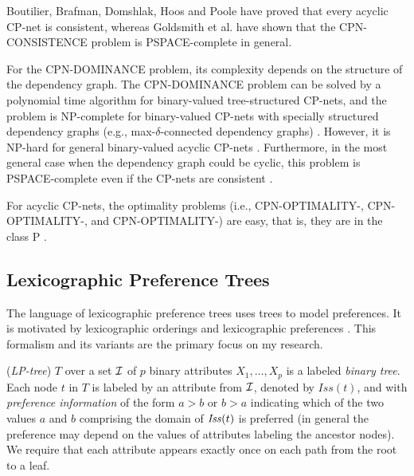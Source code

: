 


Boutilier, Brafman, Domshlak, Hoos and Poole \cite{bbdh03} 
have proved that every acyclic CP-net
is consistent, whereas Goldsmith et al. \cite{Goldsmith}
have shown that the CPN-CONSISTENCE problem is PSPACE-complete in general.

For the CPN-DOMINANCE problem, its complexity depends on the structure
of the dependency graph.
The CPN-DOMINANCE problem can be solved by
a polynomial time algorithm for binary-valued tree-structured
CP-nets, and the problem is NP-complete for binary-valued
CP-nets with specially structured dependency graphs 
(e.g., max-$\delta$-connected dependency graphs) \cite{bbdh03}.
However, it is NP-hard for general binary-valued acyclic 
CP-nets \cite{bbdh03}.
Furthermore, in the most general case when the dependency graph
could be cyclic, this problem is PSPACE-complete even
if the CP-nets are consistent \cite{Goldsmith}.

For acyclic CP-nets, the optimality problems (i.e.,
CPN-OPTIMALITY-, CPN-OPTIMALITY-, and
CPN-OPTIMALITY-) are easy, that is, they are
in the class P \cite{bbdh03}.



\subsection{Lexicographic Preference Trees \label{sec:LPT}}
The language of lexicographic preference trees \cite{booth:learningLP} 
uses trees to model preferences. It is motivated by lexicographic
orderings \cite{Kaci:Pref} and lexicographic preferences \cite{10.2307/2296854}.
This formalism and its variants are the primary focus on my research.

 (\emph{LP-tree}) $T$ over a set $\mathcal{I}$ 
of $p$ binary attributes $X_1,\ldots,X_p$ is a labeled \emph{binary tree}. Each
node $t$ in $T$ is labeled by an attribute from $\mathcal{I}$, denoted by 
$\mathit{Iss}(t)$, and with \emph{preference information} of the form
$a>b$ or $b>a$ indicating which of the two values $a$ and $b$  comprising
the domain of $\mathit{Iss}(t)$ is preferred (in general the preference may depend
on the values of attributes labeling the ancestor nodes). We require that 
each attribute appears exactly once on each path from the root to a leaf. 


